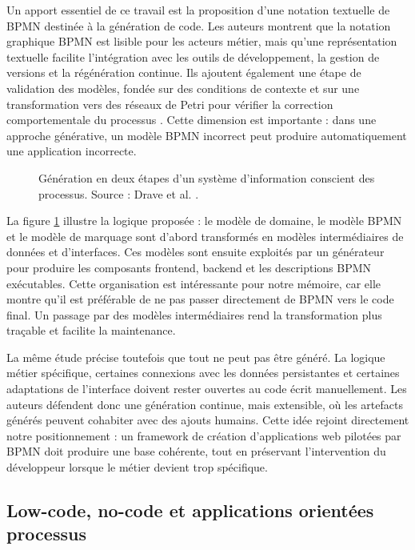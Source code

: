 Un apport essentiel de ce travail est la proposition d'une notation
textuelle de BPMN destinée à la génération de code. Les auteurs montrent
que la notation graphique BPMN est lisible pour les acteurs métier, mais
qu'une représentation textuelle facilite l'intégration avec les outils
de développement, la gestion de versions et la régénération continue.
Ils ajoutent également une étape de validation des modèles, fondée sur
des conditions de contexte et sur une transformation vers des réseaux de
Petri pour vérifier la correction comportementale du processus \cite{drave2022}.
Cette dimension est importante : dans une approche générative, un modèle
BPMN incorrect peut produire automatiquement une application incorrecte.

\begin{figure}[H]
\centering
{}
\caption{Génération en deux étapes d'un système d'information conscient
des processus. Source : Drave et al. \cite{drave2022}.}
\label{fig:generation-pais-deux-etapes}
\end{figure}

La figure \ref{fig:generation-pais-deux-etapes} illustre la logique proposée : le modèle de domaine, le
modèle BPMN et le modèle de marquage sont d'abord transformés en modèles
intermédiaires de données et d'interfaces. Ces modèles sont ensuite
exploités par un générateur pour produire les composants frontend,
backend et les descriptions BPMN exécutables. Cette organisation est
intéressante pour notre mémoire, car elle montre qu'il est préférable de
ne pas passer directement de BPMN vers le code final. Un passage par des
modèles intermédiaires rend la transformation plus traçable et facilite
la maintenance.

La même étude précise toutefois que tout ne peut pas être généré. La
logique métier spécifique, certaines connexions avec les données
persistantes et certaines adaptations de l'interface doivent rester
ouvertes au code écrit manuellement. Les auteurs défendent donc une
génération continue, mais extensible, où les artefacts générés peuvent
cohabiter avec des ajouts humains. Cette idée rejoint directement notre
positionnement : un framework de création d'applications web pilotées
par BPMN doit produire une base cohérente, tout en préservant
l'intervention du développeur lorsque le métier devient trop spécifique.

\subsection{Low-code, no-code et applications orientées processus}

